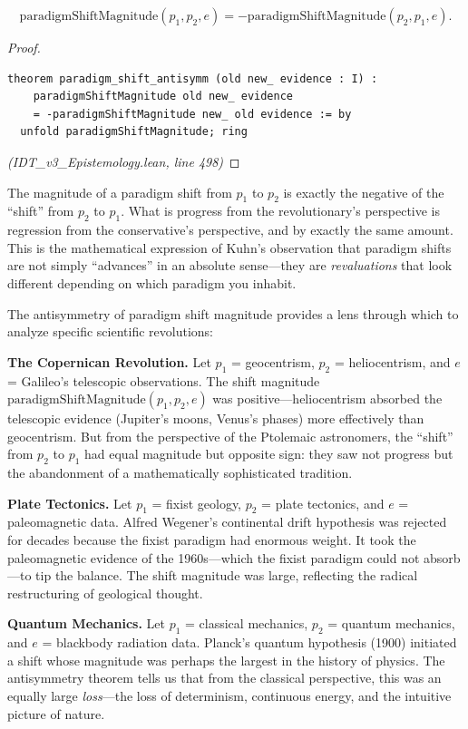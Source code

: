 \begin{theorem}
\label{thm:paradigm-shift-antisymm}
\[
  \mathrm{paradigmShiftMagnitude}(p_1, p_2, e) = -\mathrm{paradigmShiftMagnitude}(p_2, p_1, e).
\]
\end{theorem}

\begin{proof}
\begin{lstlisting}
theorem paradigm_shift_antisymm (old new_ evidence : I) :
    paradigmShiftMagnitude old new_ evidence
    = -paradigmShiftMagnitude new_ old evidence := by
  unfold paradigmShiftMagnitude; ring
\end{lstlisting}
\textit{(IDT\_v3\_Epistemology.lean, line 498)}
\end{proof}

\begin{interpretation}
The magnitude of a paradigm shift from $p_1$ to $p_2$ is exactly the negative
of the ``shift'' from $p_2$ to $p_1$. What is progress from the revolutionary's
perspective is regression from the conservative's perspective, and by exactly
the same amount. This is the mathematical expression of Kuhn's observation that
paradigm shifts are not simply ``advances'' in an absolute sense---they are
\emph{revaluations} that look different depending on which paradigm you inhabit.
\end{interpretation}

\begin{remark}
The antisymmetry of paradigm shift magnitude provides a lens through which to
analyze specific scientific revolutions:

\textbf{The Copernican Revolution.} Let $p_1$ = geocentrism, $p_2$ = heliocentrism,
and $e$ = Galileo's telescopic observations. The shift magnitude
$\mathrm{paradigmShiftMagnitude}(p_1, p_2, e)$ was positive---heliocentrism
absorbed the telescopic evidence (Jupiter's moons, Venus's phases) more effectively
than geocentrism. But from the perspective of the Ptolemaic astronomers, the ``shift''
from $p_2$ to $p_1$ had equal magnitude but opposite sign: they saw not progress
but the abandonment of a mathematically sophisticated tradition.

\textbf{Plate Tectonics.} Let $p_1$ = fixist geology, $p_2$ = plate tectonics,
and $e$ = paleomagnetic data. Alfred Wegener's continental drift hypothesis was
rejected for decades because the fixist paradigm had enormous weight. It took
the paleomagnetic evidence of the 1960s---which the fixist paradigm could not
absorb---to tip the balance. The shift magnitude was large, reflecting the
radical restructuring of geological thought.

\textbf{Quantum Mechanics.} Let $p_1$ = classical mechanics, $p_2$ = quantum
mechanics, and $e$ = blackbody radiation data. Planck's quantum hypothesis
(1900) initiated a shift whose magnitude was perhaps the largest in the history
of physics. The antisymmetry theorem tells us that from the classical perspective,
this was an equally large \emph{loss}---the loss of determinism, continuous energy,
and the intuitive picture of nature.
\end{remark}


